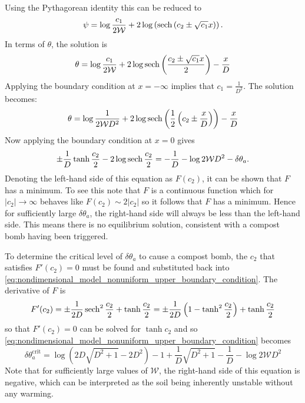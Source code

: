 Using the Pythagorean identity \parencite{riley2006} this can be reduced to
\begin{equation}
  \psi = \log \frac{c_1}{2\mathcal{W}} + 2\log \left(\sech \left(c_2 \pm \sqrt{c_1} x\right)\right).
\end{equation}
In terms of $\theta$, the solution is
\begin{equation}
  \label{eq:nondimensional_model_nonuniform_solution_general}
  \theta = \log \frac{c_1}{2\mathcal{W}} + 2 \log \sech \left( \frac{c_2 \pm \sqrt{c_1} x}{2}\right) - \frac{x}{D}
\end{equation}
Applying the boundary condition at $x = -\infty$ implies that $c_1 = \frac{1}{D^2}$.  The solution becomes:
\begin{equation}
  \label{eq:nondimensional_model_nonuniform_solution_one_bc}
  \theta = \log \frac{1}{2\mathcal{W}D^2} + 2 \log \sech \left( \frac{1}{2} \left(c_2 \pm \frac{x}{D}\right)\right) - \frac{x}{D}
\end{equation}
Now applying the boundary condition at $x = 0$ gives
\begin{equation}
  \label{eq:nondimensional_model_nonuniform_upper_boundary_condition}
  \pm\frac{1}{D}\tanh \frac{c_2}{2} - 2 \log \sech \frac{c_2}{2} = -\frac{1}{D} - \log 2\mathcal{W}D^2 - \delta\theta_a.
\end{equation}
Denoting the left-hand side of this equation as $F(c_2)$, it can be shown that $F$ has a minimum. To see this note that $F$ is a continuous function which
for $|c_2| \rightarrow \infty$ behaves like $F(c_2) \sim 2|c_2|$ so it follows %
that $F$ has a minimum. Hence for sufficiently large $\delta\theta_a$, the right-hand side will always
be less than the left-hand side. This means there is no equilibrium solution, consistent with a compost bomb having been triggered.

To determine the critical level of $\delta\theta_a$ to cause a compost bomb,
the $c_2$ that satisfies $F'(c_2) = 0$ must be found and substituted back into \cref{eq:nondimensional_model_nonuniform_upper_boundary_condition}. The derivative of $F$
is
\begin{equation}
  F'(c_2) = \pm \frac{1}{2D}\sech^2 \frac{c_2}{2} + \tanh \frac{c_2}{2} = \pm \frac{1}{2D}\left(1 - \tanh^2 \frac{c_2}{2}\right) + \tanh \frac{c_2}{2} 
\end{equation}
so that $F'(c_2) = 0$ can be solved for $\tanh c_2$ and so \cref{eq:nondimensional_model_nonuniform_upper_boundary_condition} becomes
\begin{equation}
  \label{eq:nondimensional_model_nonuniform_critical_warming}
  \delta\theta_a^{\mathrm{crit}} = \log \left(2D\sqrt{D^2 +1} - 2D^2\right) -1 + \frac{1}{D} \sqrt{D^2 + 1} - \frac{1}{D} - \log 2\mathcal{W}D^2
\end{equation}
Note that for sufficiently large values of $\mathcal{W}$, the right-hand side of this equation is negative, which can be interpreted as the soil being inherently unstable without any warming.

